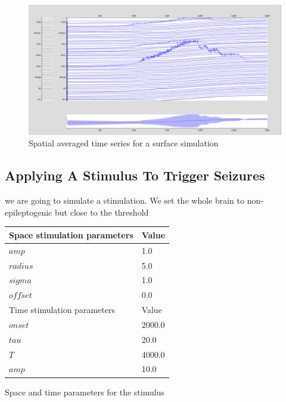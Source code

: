 \documentclass{tufte-handout}
\begin{document}
\begin{figure}[h]
  \includegraphics[width=\linewidth]{Handout_UI_ModellingEpilepsy_SpatialAverageTimeSeries}%
  \caption{Spatial averaged time series for a surface simulation}%
  \label{fig:ts_surf}%
\end{figure}



\subsection{Applying A Stimulus To Trigger Seizures}

 we are going to simulate a stimulation.
We set the whole brain to non-epileptogenic but close to the threshold

\begin{margintable}
  \centering
  \selectfont
  \begin{tabular}{ll}
    \toprule
    Space stimulation parameters & Value \\
    \midrule
             $amp$              &   1.0  \\
             $radius$           &   5.0   \\
             $sigma$            &   1.0  \\
             $offset$           &   0.0  \\
    \midrule
    \midrule
    Time stimulation parameters & Value \\
    \midrule
             $onset$          &   2000.0  \\
             $tau$            &   20.0    \\
             $T$              &   4000.0  \\
             $amp$            &   10.0    \\
    \bottomrule
  \end{tabular}
  \caption{Space and time parameters for the stimulus}
  \label{tab:stimtab}
\end{margintable}
\end{document}

